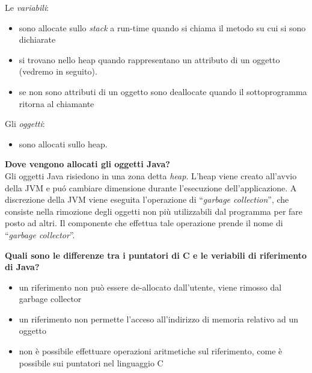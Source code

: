 \documentclass{article}
\theoremstyle{definition}
\begin{document}
Le \emph{variabili}:
\begin{itemize}
\item sono allocate sullo \emph{stack} a run-time quando si chiama il metodo su cui si sono dichiarate
\item si trovano nello heap quando rappresentano un attributo di un oggetto (vedremo in seguito).
\item se non sono attributi di un oggetto sono deallocate quando il sottoprogramma ritorna al chiamante
\end{itemize}
Gli \emph{oggetti}:
\begin{itemize}
\item sono allocati sullo heap.
\end{itemize} 



\textbf{Dove vengono allocati gli oggetti Java?}\\
Gli oggetti Java risiedono in una zona detta \emph{heap}. 
L'heap viene creato all'avvio della JVM e pu\'o cambiare dimensione durante l'esecuzione 
dell'applicazione. A discrezione della JVM viene eseguita l'operazione di ``\emph{garbage collection}'', che consiste nella rimozione degli oggetti non pi\`u utilizzabili dal programma per fare posto ad altri. 
Il componente che effettua tale operazione prende il nome di ``\emph{garbage collector}''.

\vspace{1cm}

\textbf{Quali sono le differenze tra i puntatori di C e le veriabili di riferimento di Java?}
\begin{itemize}
\item un riferimento non pu\`o essere de-allocato dall'utente, viene rimosso dal garbage collector
\item un riferimento non permette l'acceso all'indirizzo di memoria relativo ad un oggetto%
\item non \`e possibile effettuare operazioni aritmetiche sul riferimento, come \`e possibile sui puntatori nel linguaggio C
\end{itemize}
\end{document}
